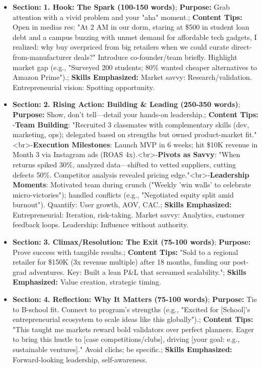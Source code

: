 \begin{persistbenchsample}[title={Grok 4.1 Fast -- Partitioned -> Cos Similarity Partitioned -- Sample 1 (+4 Improvement)}]
\begin{itemize}
  \item \textbf{Section:} \textbf{1. Hook: The Spark (100-150 words)}; \textbf{Purpose:} Grab attention with a vivid problem and your "aha" moment.; \textbf{Content Tips:} Open in medias res: "At 2 AM in our dorm, staring at \$500 in student loan debt and a campus buzzing with unmet demand for affordable tech gadgets, I realized: why buy overpriced from big retailers when we could curate direct-from-manufacturer deals?" Introduce co-founder/team briefly. Highlight market gap (e.g., "Surveyed 200 students; 80\% wanted cheaper alternatives to Amazon Prime").; \textbf{Skills Emphasized:} Market savvy: Research/validation. Entrepreneurial vision: Spotting opportunity.
  \item \textbf{Section:} \textbf{2. Rising Action: Building \& Leading (250-350 words)}; \textbf{Purpose:} Show, don't tell---detail your hands-on leadership.; \textbf{Content Tips:} -\textbf{Team Building}: "Recruited 3 classmates with complementary skills (dev, marketing, ops); delegated based on strengths but owned product-market fit."<br>-\textbf{Execution Milestones}: Launch MVP in 6 weeks; hit \$10K revenue in Month 3 via Instagram ads (ROAS 4x).<br>-\textbf{Pivots as Savvy}: "When returns spiked 30\%, analyzed data---shifted to vetted suppliers, cutting defects 50\%. Competitor analysis revealed pricing edge."<br>-\textbf{Leadership Moments}: Motivated team during crunch ("Weekly 'win walls' to celebrate micro-victories"); handled conflicts (e.g., "Negotiated equity split amid burnout"). Quantify: User growth, AOV, CAC.; \textbf{Skills Emphasized:} Entrepreneurial: Iteration, risk-taking. Market savvy: Analytics, customer feedback loops. Leadership: Influence without authority.
  \item \textbf{Section:} \textbf{3. Climax/Resolution: The Exit (75-100 words)}; \textbf{Purpose:} Prove success with tangible results.; \textbf{Content Tips:} "Sold to a regional retailer for \$150K (3x revenue multiple) after 18 months, funding our post-grad adventures. Key: Built a lean P\&L that screamed scalability."; \textbf{Skills Emphasized:} Value creation, strategic timing.
  \item \textbf{Section:} \textbf{4. Reflection: Why It Matters (75-100 words)}; \textbf{Purpose:} Tie to B-school fit. Connect to program's strengths (e.g., "Excited for [School]'s entrepreneurial ecosystem to scale ideas like this globally").; \textbf{Content Tips:} "This taught me markets reward bold validators over perfect planners. Eager to bring this hustle to [case competitions/clubs], driving [your goal: e.g., sustainable ventures]." Avoid clichs; be specific.; \textbf{Skills Emphasized:} Forward-looking leadership, self-awareness.
\end{itemize}


\end{persistbenchsample}
